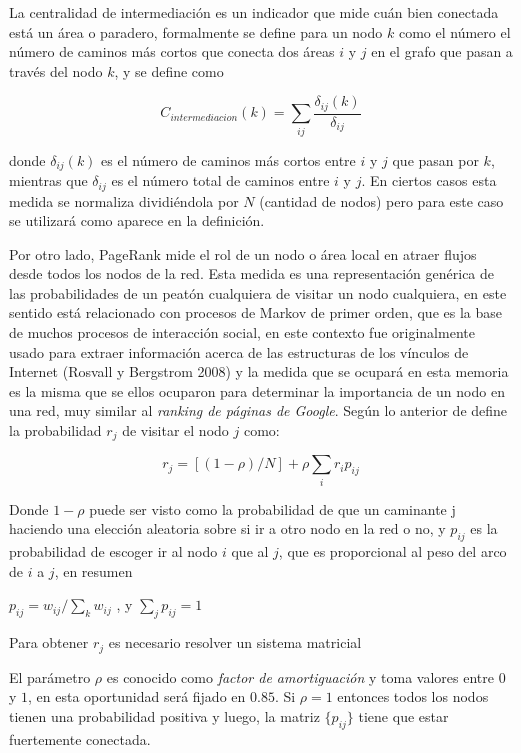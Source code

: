 \documentclass[12pt]{article}
\begin{document}
	La centralidad de intermediación es un indicador que mide cuán bien conectada está un área o paradero, formalmente se define para un nodo $k$ como el número el número de caminos más cortos que conecta dos áreas $i$ y $j$ en el grafo que pasan a través del nodo $k$, y se define como
	
$$
	C_{intermediacion}(k) = \sum_{ij} \frac{\delta_{ij} (k)}{\delta_{ij}}
$$

donde $\delta_{ij}(k)$ es el número de caminos más cortos entre $i$ y $j$ que pasan por $k$, mientras que $\delta_{ij}$ es el número total de caminos entre $i$ y $j$. En ciertos casos esta medida se normaliza dividiéndola por $N$ (cantidad de nodos) pero para este caso se utilizará como aparece en la definición.

Por otro lado, PageRank mide el rol de un nodo o área local en atraer flujos desde todos los nodos de la red. Esta medida es una representación genérica de las probabilidades de un peatón cualquiera de visitar un nodo cualquiera, en este sentido está relacionado con procesos de Markov de primer orden, que es la base de muchos procesos de interacción social, en este contexto  fue originalmente usado para extraer información acerca de las estructuras de los vínculos de Internet (Rosvall y Bergstrom 2008)\cite{Infomap} y la medida que se ocupará en esta memoria es la misma que se ellos ocuparon para determinar la importancia de un nodo en una red, muy similar al \textit{ranking de páginas de Google}. Según lo anterior de define la probabilidad $r_j$ de visitar el nodo $j$ como:

$$
	r_j = [(1-\rho)/N]+\rho\sum_i r_ip_{ij}
$$

Donde $1-\rho$ puede ser visto como la probabilidad de que un caminante j haciendo una elección aleatoria sobre si ir a otro nodo en la red o no, y $p_{ij}$  es la probabilidad de escoger ir al nodo $i$ que al $j$, que es proporcional al peso del arco de $i$ a $j$, en resumen

\begin{center}
$	p_{ij}=w_{ij}/\sum\limits_k w_{ij}$ , y $\sum\limits_j p_{ij}= 1$
\end{center}

Para obtener $r_j$ es necesario resolver un sistema matricial

El parámetro $\rho$ es conocido como \textit{factor de amortiguación} y toma valores entre $0$ y $1$, en esta oportunidad será fijado en $0.85$. Si $\rho=1$ entonces todos los nodos tienen una probabilidad positiva y luego, la matriz $\{p_{ij}\}$ tiene que estar fuertemente conectada.
\end{document}
